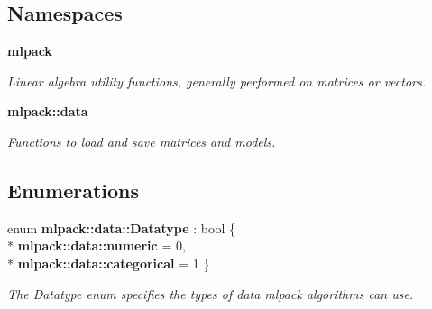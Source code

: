\subsection*{Namespaces}
\begin{DoxyCompactItemize}
\item 
 {\bf mlpack}
\begin{DoxyCompactList}\small\item\em Linear algebra utility functions, generally performed on matrices or vectors. \end{DoxyCompactList}\item 
 {\bf mlpack\+::data}
\begin{DoxyCompactList}\small\item\em Functions to load and save matrices and models. \end{DoxyCompactList}\end{DoxyCompactItemize}
\subsection*{Enumerations}
\begin{DoxyCompactItemize}
\item 
enum {\bf mlpack\+::data\+::\+Datatype} \+: bool \{ \\*
{\bf mlpack\+::data\+::numeric} = 0, 
\\*
{\bf mlpack\+::data\+::categorical} = 1
 \}\begin{DoxyCompactList}\small\item\em The Datatype enum specifies the types of data mlpack algorithms can use. \end{DoxyCompactList}
\end{DoxyCompactItemize}
